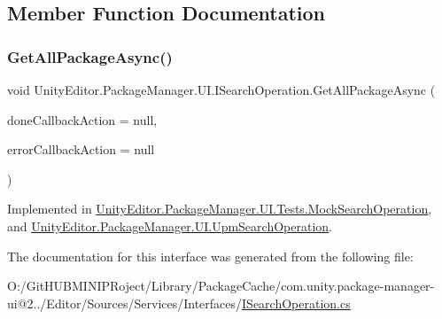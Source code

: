 \subsection{Member Function Documentation}
\mbox{\label{interface_unity_editor_1_1_package_manager_1_1_u_i_1_1_i_search_operation_af96c1798a1e3b84d88c4da64dcb1f05d}} 
\subsubsection{\texorpdfstring{GetAllPackageAsync()}{GetAllPackageAsync()}}
{\footnotesize\ttfamily void Unity\+Editor.\+Package\+Manager.\+U\+I.\+I\+Search\+Operation.\+Get\+All\+Package\+Async (\begin{DoxyParamCaption}\item[{Action$<$ I\+Enumerable$<$ \mbox{\hyperlink{class_unity_editor_1_1_package_manager_1_1_u_i_1_1_package_info}{Package\+Info}} $>$$>$}]{done\+Callback\+Action = {\ttfamily null},  }\item[{Action$<$ \mbox{\hyperlink{namespace_unity_editor_1_1_package_manager_1_1_u_i_ab1815eb3e48074893d9dc1dc99a4a32aa902b0d55fddef6f8d651fe1035b7d4bd}{Error}} $>$}]{error\+Callback\+Action = {\ttfamily null} }\end{DoxyParamCaption})}



Implemented in \mbox{\hyperlink{class_unity_editor_1_1_package_manager_1_1_u_i_1_1_tests_1_1_mock_search_operation_add03cecd70ccc2ab64efe6787c5333a6}{Unity\+Editor.\+Package\+Manager.\+U\+I.\+Tests.\+Mock\+Search\+Operation}}, and \mbox{\hyperlink{class_unity_editor_1_1_package_manager_1_1_u_i_1_1_upm_search_operation_a91ffb1376e5ee22e1e845960dad16437}{Unity\+Editor.\+Package\+Manager.\+U\+I.\+Upm\+Search\+Operation}}.



The documentation for this interface was generated from the following file\+:\begin{DoxyCompactItemize}
\item 
O\+:/\+Git\+H\+U\+B\+M\+I\+N\+I\+P\+Roject/\+Library/\+Package\+Cache/com.\+unity.\+package-\/manager-\/ui@2../\+Editor/\+Sources/\+Services/\+Interfaces/\mbox{\hyperlink{_i_search_operation_8cs}{I\+Search\+Operation.\+cs}}\end{DoxyCompactItemize}
